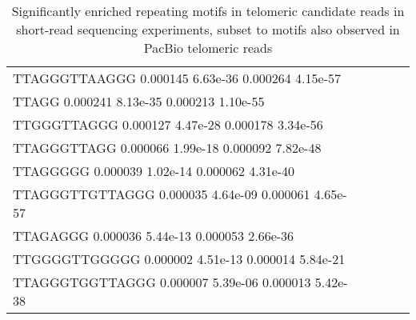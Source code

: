 \begin{samepage}
\begin{table}[h!]
\begin{tabular}{lllll}
TTAGGGTTAAGGG    0.000145                   6.63e-36                       0.000264                   4.15e-57                  \\
TTAGG            0.000241                   8.13e-35                       0.000213                   1.10e-55                  \\
TTGGGTTAGGG      0.000127                   4.47e-28                       0.000178                   3.34e-56                  \\
TTAGGGTTAGG      0.000066                   1.99e-18                       0.000092                   7.82e-48                  \\
TTAGGGGG         0.000039                   1.02e-14                       0.000062                   4.31e-40                  \\
TTAGGGTTGTTAGGG  0.000035                   4.64e-09                       0.000061                   4.65e-57                  \\
TTAGAGGG         0.000036                   5.44e-13                       0.000053                   2.66e-36                  \\
TTGGGGTTGGGGG    0.000002                   4.51e-13                       0.000014                   5.84e-21                  \\
TTAGGGTGGTTAGGG  0.000007                   5.39e-06                       0.000013                   5.42e-38                  \\
\hline
\end{tabular}
\caption{Significantly enriched repeating motifs in telomeric candidate reads in short-read sequencing experiments, subset to motifs also observed in PacBio telomeric reads}
\label{tab:repeatfinder_shortread}
\end{table}
\end{samepage}
